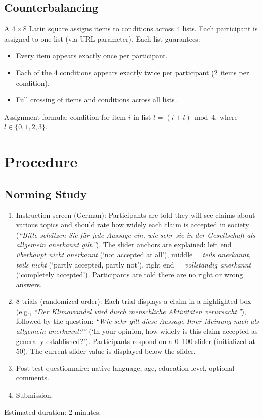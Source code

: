 \documentclass[12pt]{article}
\begin{document}
\subsection{Counterbalancing}

A $4 \times 8$ Latin square assigns items to conditions across 4 lists. Each participant is assigned to one list (via URL parameter). Each list guarantees:
\begin{itemize}
    \item Every item appears exactly once per participant.
    \item Each of the 4 conditions appears exactly twice per participant (2 items per condition).
    \item Full crossing of items and conditions across all lists.
\end{itemize}

Assignment formula: condition for item $i$ in list $l$ = $(i + l) \bmod 4$, where $l \in \{0, 1, 2, 3\}$.


\section{Procedure}

\subsection{Norming Study}
\begin{enumerate}
    \item Instruction screen (German): Participants are told they will see claims about various topics and should rate how widely each claim is accepted in society (\textit{``Bitte sch\"atzen Sie f\"ur jede Aussage ein, wie sehr sie in der Gesellschaft als allgemein anerkannt gilt.''}). The slider anchors are explained: left end = \textit{\"uberhaupt nicht anerkannt} (`not accepted at all'), middle = \textit{teils anerkannt, teils nicht} (`partly accepted, partly not'), right end = \textit{vollst\"andig anerkannt} (`completely accepted'). Participants are told there are no right or wrong answers.
    \item 8 trials (randomized order): Each trial displays a claim in a highlighted box (e.g., \textit{``Der Klimawandel wird durch menschliche Aktivit\"aten verursacht.''}), followed by the question: \textit{``Wie sehr gilt diese Aussage Ihrer Meinung nach als allgemein anerkannt?''} (`In your opinion, how widely is this claim accepted as generally established?'). Participants respond on a 0--100 slider (initialized at 50). The current slider value is displayed below the slider.
    \item Post-test questionnaire: native language, age, education level, optional comments.
    \item Submission.
\end{enumerate}
Estimated duration: 2 minutes.
\end{document}

